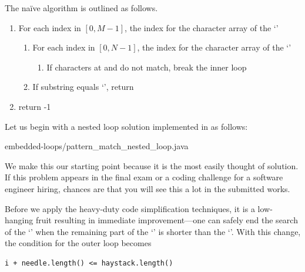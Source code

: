 The naïve algorithm is outlined as follows.
\begin{alisting}
\caption{\label{alg:string-search-naive-algorithm}
A naïve algorithm for string search whose runtime complexity is $O(MN)$ where $M$ and $N$ are
the string lengths.}
\begin{enumerate}
\item For each index  in $[0, M-1]$, the index for the character array of
the `'
\begin{enumerate}
\item For each index  in $[0, N-1]$, the index for the
character array of the `'
\begin{enumerate}
\item If characters at  and  do not match, break the inner loop
\end{enumerate}
\item If substring  equals `', return 
\end{enumerate}
\item return -1
\end{enumerate}
\end{alisting}


Let us begin with a nested loop solution implemented in \java as follows:
\begin{clisting}

{embedded-loops/pattern_match_nested_loop.java}
\end{clisting}
We make this our starting point because it is the most easily thought of solution.
If this problem appears in the final exam or a coding challenge for a software engineer hiring,
chances are that you will see this a lot in the submitted works.


Before we apply the heavy-duty code simplification techniques,
it is a low-hanging fruit resulting in immediate improvement---one can safely end the search of the
`' when the remaining part of the `' is shorter than the `'.
With this change, the condition for the outer loop becomes
\begin{lstlisting}
i + needle.length() <= haystack.length()
\end{lstlisting}



